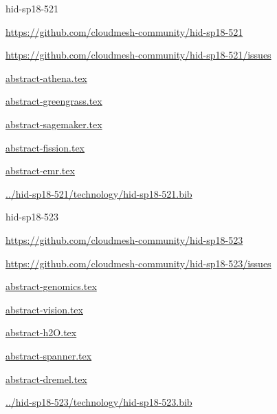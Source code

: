 \begin{IU}

hid-sp18-521

\url{https://github.com/cloudmesh-community/hid-sp18-521}

\url{https://github.com/cloudmesh-community/hid-sp18-521/issues}

\href{https://github.com/cloudmesh-community/hid-sp18-521/blob/master//technology/abstract-athena.tex}{abstract-athena.tex}

\href{https://github.com/cloudmesh-community/hid-sp18-521/blob/master//technology/abstract-greengrass.tex}{abstract-greengrass.tex}

\href{https://github.com/cloudmesh-community/hid-sp18-521/blob/master//technology/abstract-sagemaker.tex}{abstract-sagemaker.tex}

\href{https://github.com/cloudmesh-community/hid-sp18-521/blob/master//technology/abstract-fission.tex}{abstract-fission.tex}

\href{https://github.com/cloudmesh-community/hid-sp18-521/blob/master//technology/abstract-emr.tex}{abstract-emr.tex}

\href{https://github.com/cloudmesh-community/hid-sp18-521/blob/master//technology/hid-sp18-521.bib}{../hid-sp18-521/technology/hid-sp18-521.bib}

\end{IU}


\begin{IU}

hid-sp18-523

\url{https://github.com/cloudmesh-community/hid-sp18-523}

\url{https://github.com/cloudmesh-community/hid-sp18-523/issues}

\href{https://github.com/cloudmesh-community/hid-sp18-523/blob/master//technology/abstract-genomics.tex}{abstract-genomics.tex}

\href{https://github.com/cloudmesh-community/hid-sp18-523/blob/master//technology/abstract-vision.tex}{abstract-vision.tex}

\href{https://github.com/cloudmesh-community/hid-sp18-523/blob/master//technology/abstract-h2O.tex}{abstract-h2O.tex}

\href{https://github.com/cloudmesh-community/hid-sp18-523/blob/master//technology/abstract-spanner.tex}{abstract-spanner.tex}

\href{https://github.com/cloudmesh-community/hid-sp18-523/blob/master//technology/abstract-dremel.tex}{abstract-dremel.tex}

\href{https://github.com/cloudmesh-community/hid-sp18-523/blob/master//technology/hid-sp18-523.bib}{../hid-sp18-523/technology/hid-sp18-523.bib}

\end{IU}


